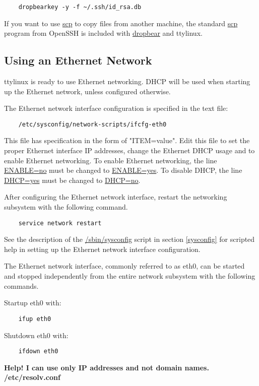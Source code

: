 \documentclass[10pt]{article}
\begin{document}
\begin{lstlisting}
	dropbearkey -y -f ~/.ssh/id_rsa.db
\end{lstlisting}

If you want to use \url{scp} to copy files from another machine, the standard
\url{scp} program from OpenSSH is included with \url{dropbear} and ttylinux.

\subsection{Using an Ethernet Network}

ttylinux is ready to use Ethernet networking. DHCP will be used when starting
up the Ethernet network, unless configured otherwise.

The Ethernet network interface configuration is specified in the text file:
\begin{lstlisting}
	/etc/sysconfig/network-scripts/ifcfg-eth0
\end{lstlisting}

This file has specification in the form of "ITEM=value". Edit this file to set
the proper Ethernet interface IP addresses, change the Ethernet DHCP usage and
to enable Ethernet networking. To enable Ethernet networking, the line
\url{ENABLE=no} must be changed to \url{ENABLE=yes}. To disable DHCP, the line
\url{DHCP=yes} must be changed to \url{DHCP=no}.

After configuring the Ethernet network interface, restart the networking
subsystem with the following command.

\begin{lstlisting}
	service network restart
\end{lstlisting}

See the description of the \url{/sbin/sysconfig} script in section
\ref{sysconfig} for scripted help in setting up the Ethernet network interface
configuration.

The Ethernet network interface, commonly referred to as eth0, can be started
and stopped independently from the entire network subsystem with the following
commands.

Startup eth0 with:
\begin{lstlisting}
	ifup eth0
\end{lstlisting}

Shutdown eth0 with:
\begin{lstlisting}
	ifdown eth0
\end{lstlisting}

{\bf Help! I can use only IP addresses and not domain names.}\\
{\bf /etc/resolv.conf}
\end{document}
